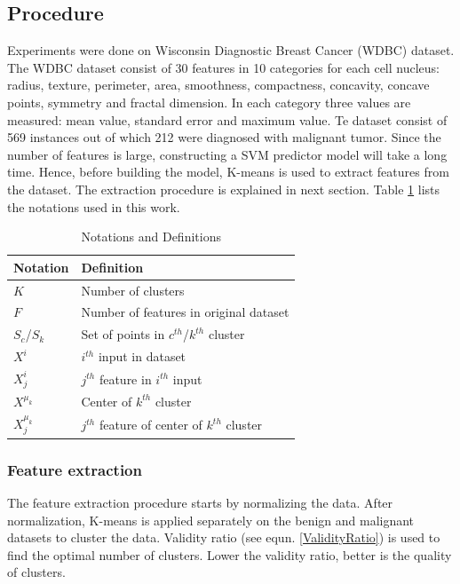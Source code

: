 \documentclass[twoside]{iitbreport}
\begin{document}
\subsection{Procedure}
Experiments were done on Wisconsin Diagnostic Breast Cancer (WDBC) dataset. The WDBC dataset consist of 30 features in 10 categories for each cell nucleus: radius, texture, perimeter, area, smoothness, compactness, concavity, concave points, symmetry and fractal dimension. In each category three values are measured: mean value, standard error and maximum value. Te dataset consist of 569 instances out of which 212 were diagnosed with malignant tumor. Since the number of features is large, constructing a SVM predictor model will take a long time. Hence, before building the model, K-means is used to extract features from the dataset. The extraction procedure is explained in next section. Table \ref{NotDef} lists the notations used in this work.
 
\begin{table}[]
\centering
\begin{tabular}{|l|l|}
\hline
Notation      & Definition                                   \\ \hline
$K$           & Number of clusters                           \\
$F$           & Number of features in original dataset       \\
$S_c$/$S_k$   & Set of points in $c^{th}$/$k^{th}$ cluster   \\
$X^i$         & $i^{th}$ input in dataset                    \\
$X^i_j$       & $j^{th}$ feature in $i^{th}$ input           \\
$X^{\mu_k}$   & Center of $k^{th}$ cluster                     \\
$X^{\mu_k}_j$ & $j^{th}$ feature of center of $k^{th}$ cluster \\ \hline
\end{tabular}
\caption{Notations and Definitions}
\label{NotDef}
\end{table}

\subsubsection{Feature extraction}
The feature extraction procedure starts by normalizing the data. After normalization, K-means is applied separately on the benign and malignant datasets to cluster the data. Validity ratio (see equn. \ref{ValidityRatio}) is used to find the optimal number of clusters. Lower the validity ratio, better is the quality of clusters.
\end{document}
